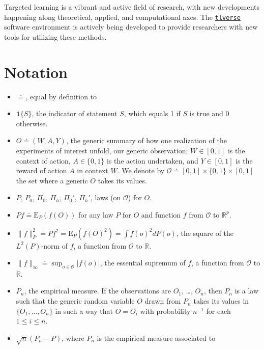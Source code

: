 \documentclass[
  11pt,
  openright,twoside]{book}
\newcommand{\bbR}{\mathbb{R}}
\newcommand{\defq}{\doteq}
\newcommand{\calO}{\mathcal{O}}
\newcommand{\Exp}{\textrm{E}}
\newcommand{\one}{\textbf{1}}
\theoremstyle{definition}
\theoremstyle{definition}
\theoremstyle{definition}
\theoremstyle{definition}
\theoremstyle{remark}
\begin{document}
Targeted learning is a vibrant and active field of research, with new
developments happening along theoretical, applied, and computational axes. The
\href{https://tlverse.org/}{\texttt{tlverse}} software environment is actively being
developed to provide researchers with new tools for utilizing these methods.

\hypertarget{appendix-appendix}{%
\appendix}


\hypertarget{notation}{%
\chapter{Notation}\label{notation}}

\begin{itemize}
\item
  \(\defq\), equal by definition to
\item
  \(\one\{S\}\), the indicator of statement \(S\), which equals 1 if \(S\) is true
  and 0 otherwise.
\item
  \(O \defq (W,A,Y)\), the generic summary of how one realization of the experiments
  of interest unfold, our generic observation; \(W \in [0,1]\) is the context of
  action, \(A \in \{0,1\}\) is the action undertaken, and \(Y\in [0,1]\) is the
  reward of action \(A\) in context \(W\). We denote by \(\calO \defq [0,1] \times \{0,1\} \times [0,1]\) the set where a generic \(O\) takes its values.
\item
  \(P\), \(P_{0}\), \(\Pi_{0}\), \(\Pi_{h}\), \(\Pi_{0}'\), \(\Pi_{h}'\), laws (on \(\calO\))
  for \(O\).
\item
  \(Pf \defq \Exp_{P} (f(O))\) for any law \(P\) for \(O\) and function \(f\) from
  \(\calO\) to \(\bbR^{p}\).
\item
  \(\|f\|_{P}^{2} \defq Pf^{2} = \Exp_{P} (f(O)^{2}) = \int f(o)^{2} dP(o)\),
  the square of the \(L^{2}(P)\)-norm of \(f\), a function from \(\calO\) to \(\bbR\).
\item
  \(\|f\|_{\infty} \defq \sup_{o \in \calO} |f(o)|\), the essential supremum of
  \(f\), a function from \(\calO\) to \(\bbR\).
\item
  \(P_{n}\), the empirical measure. If the observations are \(O_{1}\), \ldots,
  \(O_{n}\), then \(P_{n}\) is a law such that the generic random variable \(O\) drawn
  from \(P_{n}\) takes its values in \(\{O_{1}, \ldots, O_{n}\}\) in such a way that
  \(O = O_{i}\) with probability \(n^{-1}\) for each \(1 \leq i \leq n\).
\item
  \(\sqrt{n} (P_{n} - P)\), where \(P_{n}\) is the empirical measure associated to

\end{itemize}
\end{document}
